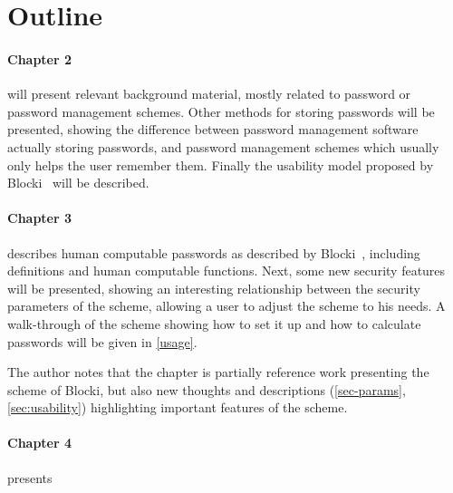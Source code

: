 \section{Outline}
\paragraph{Chapter 2} will present relevant background material, mostly related to password or password management schemes. Other methods for storing passwords will be presented, showing the difference between password management software actually storing passwords, and password management schemes which usually only helps the user remember them. Finally the usability model proposed by Blocki~\cite{Blocki2014} will be described.
\paragraph{Chapter 3} describes human computable passwords as described by Blocki~\cite{hcp-blocki}, including definitions and human computable functions. Next, some new security features will be presented, showing an interesting relationship between the security parameters of the scheme, allowing a user to adjust the scheme to his needs. A walk-through of the scheme showing how to set it up and how to calculate passwords will be given in \autoref{usage}.
\par The author notes that the chapter is partially reference work presenting the scheme of Blocki, but also new thoughts and descriptions (\autoref{sec-params}, \autoref{sec:usability}) highlighting important features of the scheme. 
\paragraph{Chapter 4} presents 


